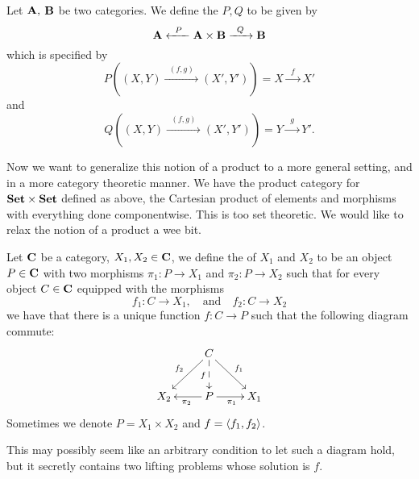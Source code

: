 \begin{defn}%
Let $\mathbf{A},$ $\mathbf{B}$ be two categories. We define the
 $P,Q$ to
be given by
\begin{equation}%
\ms{A}\xleftarrow{\;\;P\;\;}\ms{A}\times\ms{B}\xrightarrow{\;\;Q\;\;}\ms{B}
\end{equation}
which is specified by
\begin{equation*}%
P\left((X,Y)\xrightarrow{\;\;(f,g)\;\;}(X',Y')\right) = X\xrightarrow{\;\;f\;\;}X'
\end{equation*}
and
\begin{equation*}%
Q\left((X,Y)\xrightarrow{\;\;(f,g)\;\;}(X',Y')\right) = Y\xrightarrow{\;\;g\;\;}Y'.
\end{equation*}
\end{defn}

Now we want to generalize this notion of a product to a more
general setting, and in a more category theoretic manner. We have
the product category for $\mathbf{Set}\times\mathbf{Set}$ defined as
above, the Cartesian product of elements and morphisms with
everything done componentwise. This is too set theoretic. We
would like to relax the notion of a product a wee bit.

\begin{defn}%
Let $\mathbf{C}$ be a category, $X_{1},X_{2}\in\mathbf{C}$, we define the
 of $X_1$ and $X_2$ to be an object $P\in\mathbf{C}$
with two morphisms $\pi_{1}:P\to X_{1}$ and $\pi_{2}:P\to X_{2}$
such that for every object $C\in\mathbf{C}$ equipped with the
morphisms
\begin{equation}%
f_{1}:C\to X_{1},\quad\text{and}\quad f_{2}:C\to X_{2}
\end{equation}
we have that there is a unique function $f:C\to P$ such that the
following diagram commute:
\begin{equation}%
\vcenter{\xymatrix{
&\ar[dl]_{f_{2}}C\ar@{-->}[d]_{f}\ar[dr]^{f_{1}}&\\
X_{2}&\ar[l]^{\pi_{2}}P\ar[r]_{\pi_{1}}&X_{1}
}}
\end{equation}
\noindent Sometimes we denote $P=X_{1}\times X_{2}$ and $f=\langle f_{1},f_{2}\rangle$.
\end{defn}
This may possibly seem like an arbitrary condition to let such a
diagram hold, but it secretly contains two lifting problems
whose solution is $f$.
